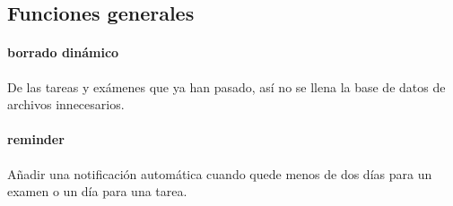 \documentclass[a4paper]{article}
\begin{document}
\subsection[Generales]{Funciones generales}
\paragraph{borrado dinámico}
De las tareas y exámenes que ya han pasado, así no se llena la base de datos de 
archivos innecesarios.

\paragraph{reminder}
Añadir una notificación automática cuando quede menos de dos días para un examen o un día para
una tarea.
\end{document}
